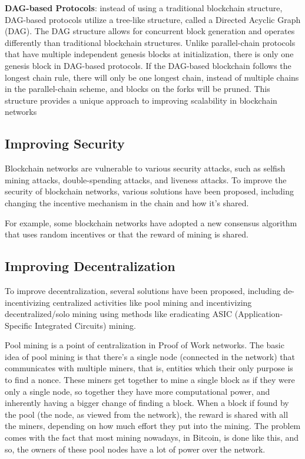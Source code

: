 \textbf{DAG-based Protocols}: instead of using a traditional blockchain structure, DAG-based protocols utilize a tree-like structure, called a Directed Acyclic Graph (DAG). The DAG structure allows for concurrent block generation and operates differently than traditional blockchain structures. Unlike parallel-chain protocols that have multiple independent genesis blocks at initialization, there is only one genesis block in DAG-based protocols. If the DAG-based blockchain follows the longest chain rule, there will only be one longest chain, instead of multiple chains in the parallel-chain scheme, and blocks on the forks will be pruned. This structure provides a unique approach to improving scalability in blockchain networks 

\subsection*{Improving Security}
Blockchain networks are vulnerable to various security attacks, such as selfish mining attacks, double-spending attacks, and liveness attacks. To improve the security of blockchain networks, various solutions have been proposed, including changing the incentive mechanism in the chain and how it's shared.

For example, some blockchain networks have adopted a new consensus algorithm that uses random incentives or that the reward of mining is shared.

\subsection*{Improving Decentralization}
To improve decentralization, several solutions have been proposed, including de-incentivizing centralized activities like pool mining and incentivizing decentralized/solo mining using methods like eradicating ASIC (Application-Specific Integrated Circuits) mining.

Pool mining is a point of centralization in Proof of Work networks. The basic idea of pool mining is that there's a single node (connected in the network) that communicates with multiple miners, that is, entities which their only purpose is to find a nonce.
These miners get together to mine a single block as if they were only a single node, so together they have more computational power, and inherently having a bigger change of finding a block. When a block if found by the pool (the node, as viewed from the network), the reward is shared with all the miners, depending on how much effort they put into the mining.
The problem comes with the fact that most mining nowadays, in Bitcoin, is done like this, and so, the owners of these pool nodes have a lot of power over the network.

